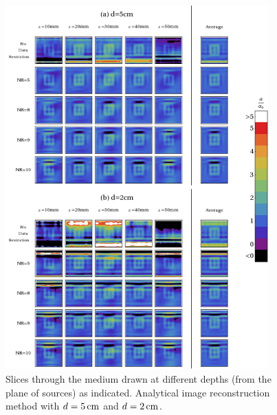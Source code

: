\begin{figure}[htbp]
\begin{center}
\begin{minipage}[h]{1\textwidth}
\begin{center}
\includegraphics[width=0.9\textwidth]{./figures/chestwall_5.pdf}
\end{center}
\end{minipage}
\end{center}
\caption{\label{fig:slices_analytical}
  Slices through the medium drawn at different depths (from the plane
  of sources) as indicated. Analytical image reconstruction method
  with $d=5\,{\rm cm}$ and $d=2\,{\rm cm}$.}
\end{figure}


